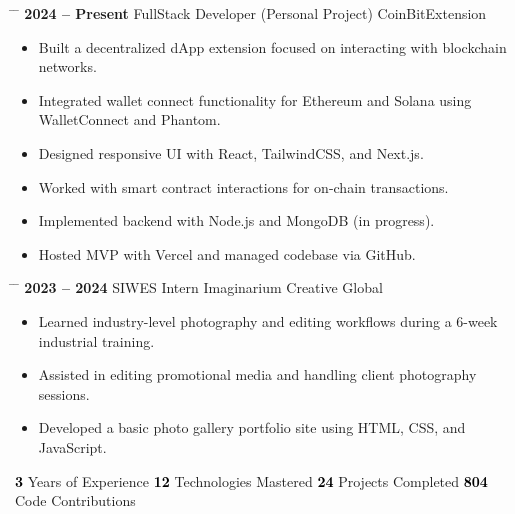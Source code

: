 \documentclass{article}
\newcommand{\sectiondivider}[2][0.4]{%
    \noindent
    \vspace{3pt}
    \textcolor{black}{%
        \noindent
        \makebox[\linewidth]{\rule{#1\linewidth}{0.5pt}%
        \hspace{5pt} \textbf{\uppercase{#2}} \hspace{5pt}%
        \rule{#1\linewidth}{0.5pt}}%
    }
    \vspace{3pt}
}
\begin{document}
\vspace{0.2cm}
\noindent
\begin{tabbing}
    \hspace{5cm} \= \hspace{8cm} \= \kill 
    \textbf{2024 -- Present} \> FullStack Developer (Personal Project)  \> CoinBitExtension \\[0.1cm]
\end{tabbing}
\vspace{-0.3cm}
\begin{itemize}
    \item Built a decentralized dApp extension focused on interacting with blockchain networks.
    \item Integrated wallet connect functionality for Ethereum and Solana using WalletConnect and Phantom.
    \item Designed responsive UI with React, TailwindCSS, and Next.js.
    \item Worked with smart contract interactions for on-chain transactions.
    \item Implemented backend with Node.js and MongoDB (in progress).
    \item Hosted MVP with Vercel and managed codebase via GitHub.
\end{itemize}

\vspace{0.2cm}
\noindent
\begin{tabbing}
    \hspace{5cm} \= \hspace{8cm} \= \kill 
    \textbf{2023 -- 2024} \> SIWES Intern  \> Imaginarium Creative Global \\[0.1cm]
\end{tabbing}
\vspace{-0.3cm}
\begin{itemize}
    \item Learned industry-level photography and editing workflows during a 6-week industrial training.
    \item Assisted in editing promotional media and handling client photography sessions.
    \item Developed a basic photo gallery portfolio site using HTML, CSS, and JavaScript.
\end{itemize}

\vspace{0.5cm}
\sectiondivider[0.35]{Performance Highlights}

\noindent
\textbf{\huge \textcolor{black}{3}} \textnormal{Years of Experience} \hspace{0.75cm}
\textbf{\huge \textcolor{black}{12}} \textnormal{Technologies Mastered} \hspace{0.75cm}
\textbf{\huge \textcolor{black}{24}} \textnormal{Projects Completed} \hspace{0.75cm}
\textbf{\huge \textcolor{black}{804}} \textnormal{Code Contributions}
\end{document}
